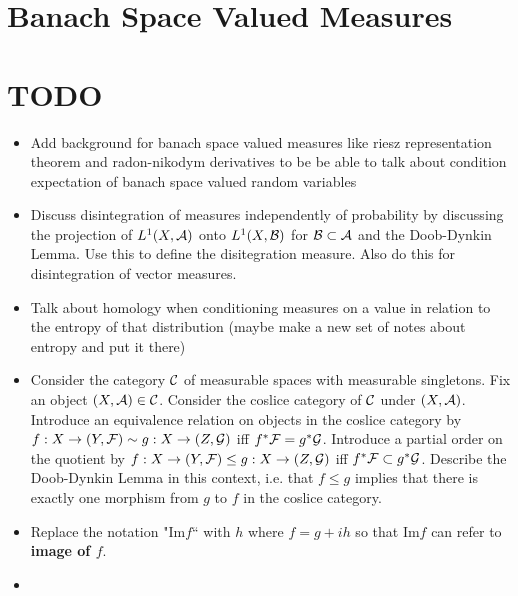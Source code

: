 \documentclass{book}
\begin{document}
	
	
	
	
	
	
	\newpage
	\chapter{Banach Space Valued Measures}
	

























	\newpage
	\chapter{TODO}
	\begin{itemize}
		\item Add background for banach space valued measures like riesz representation theorem and radon-nikodym derivatives to be be able to talk about condition expectation of banach space valued random variables
		\item Discuss disintegration of measures independently of probability by discussing the projection of $L^1(X, \mathcal{A})$ onto $L^1(X, \mathcal{B})$ for $\mathcal{B} \subset \mathcal{A}$ and the Doob-Dynkin Lemma. Use this to define the disitegration measure. Also do this for disintegration of vector measures.
		\item Talk about homology when conditioning measures on a value in relation to the entropy of that distribution (maybe make a new set of notes about entropy and put it there)
		\item Consider the category $\mathcal{C}$ of measurable spaces with measurable singletons. Fix an object $(X, \mathcal{A}) \in \mathcal{C}$. Consider the coslice category of $\mathcal{C}$ under $(X, \mathcal{A})$. Introduce an equivalence relation on objects in the coslice category by $f:X \rightarrow (Y, \mathcal{F}) \sim g: X \rightarrow (Z, \mathcal{G})$ iff $f^*\mathcal{F} = g^*\mathcal{G}$. Introduce a partial order on the quotient by $f:X \rightarrow (Y, \mathcal{F}) \leq g: X \rightarrow (Z, \mathcal{G})$ iff $f^*\mathcal{F} \subset g^*\mathcal{G}$.  Describe the Doob-Dynkin Lemma in this context, i.e. that $f \leq g$ implies that there is exactly one morphism from $g$ to $f$ in the coslice category.
		\item  Replace the notation "$\text{Im} f$`` with $h$ where $f = g + ih$ so that $\text{Im}f$ can refer to \textbf{image of $f$}.
		\item {} 
	\end{itemize}
\end{document}
